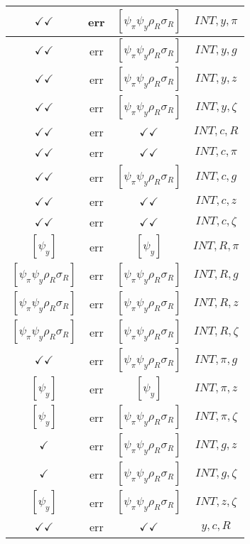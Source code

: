 \documentclass[a4paper,10pt]{article}
\begin{document}
\begin{longtable}{|c|c|c|c|}
\hline
$\checkmark\checkmark$ & err & $[\psi_\pi \psi_y \rho_R \sigma_R ]$ & ${INT},{y},{\pi}$ \\
\hline
$\checkmark\checkmark$ & err & $[\psi_\pi \psi_y \rho_R \sigma_R ]$ & ${INT},{y},{g}$ \\
\hline
$\checkmark\checkmark$ & err & $[\psi_\pi \psi_y \rho_R \sigma_R ]$ & ${INT},{y},{z}$ \\
\hline
$\checkmark\checkmark$ & err & $[\psi_\pi \psi_y \rho_R \sigma_R ]$ & ${INT},{y},{\zeta}$ \\
\hline
$\checkmark\checkmark$ & err & $\checkmark\checkmark$ & ${INT},{c},{R}$ \\
\hline
$\checkmark\checkmark$ & err & $\checkmark\checkmark$ & ${INT},{c},{\pi}$ \\
\hline
$\checkmark\checkmark$ & err & $[\psi_\pi \psi_y \rho_R \sigma_R ]$ & ${INT},{c},{g}$ \\
\hline
$\checkmark\checkmark$ & err & $\checkmark\checkmark$ & ${INT},{c},{z}$ \\
\hline
$\checkmark\checkmark$ & err & $\checkmark\checkmark$ & ${INT},{c},{\zeta}$ \\
\hline
$[\psi_y ]$ & err & $[\psi_y ]$ & ${INT},{R},{\pi}$ \\
\hline
$[\psi_\pi \psi_y \rho_R \sigma_R ]$ & err & $[\psi_\pi \psi_y \rho_R \sigma_R ]$ & ${INT},{R},{g}$ \\
\hline
$[\psi_\pi \psi_y \rho_R \sigma_R ]$ & err & $[\psi_\pi \psi_y \rho_R \sigma_R ]$ & ${INT},{R},{z}$ \\
\hline
$[\psi_\pi \psi_y \rho_R \sigma_R ]$ & err & $[\psi_\pi \psi_y \rho_R \sigma_R ]$ & ${INT},{R},{\zeta}$ \\
\hline
$\checkmark\checkmark$ & err & $[\psi_\pi \psi_y \rho_R \sigma_R ]$ & ${INT},{\pi},{g}$ \\
\hline
$[\psi_y ]$ & err & $[\psi_y ]$ & ${INT},{\pi},{z}$ \\
\hline
$[\psi_y ]$ & err & $[\psi_\pi \psi_y \rho_R \sigma_R ]$ & ${INT},{\pi},{\zeta}$ \\
\hline
$\checkmark$ & err & $[\psi_\pi \psi_y \rho_R \sigma_R ]$ & ${INT},{g},{z}$ \\
\hline
$\checkmark$ & err & $[\psi_\pi \psi_y \rho_R \sigma_R ]$ & ${INT},{g},{\zeta}$ \\
\hline
$[\psi_y ]$ & err & $[\psi_\pi \psi_y \rho_R \sigma_R ]$ & ${INT},{z},{\zeta}$ \\
\hline
$\checkmark\checkmark$ & err & $\checkmark\checkmark$ & ${y},{c},{R}$ \\

\end{longtable}
\end{document}
